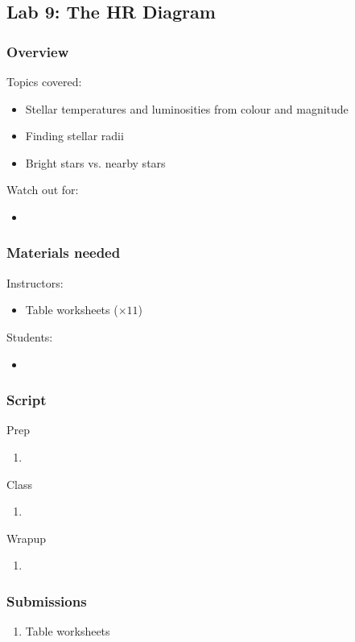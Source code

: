 \documentclass[12pt]{article}
\begin{document}
\newpage
\subsection{Lab 9: The HR Diagram}
\subsubsection{Overview}
Topics covered:
\begin{itemize}
\item Stellar temperatures and luminosities from colour and magnitude
\item Finding stellar radii
\item Bright stars vs. nearby stars
\end{itemize}
Watch out for:
\begin{itemize}
\item 
\end{itemize}

\subsubsection{Materials needed}
Instructors:
\begin{itemize}
  \item Table worksheets ($\times 11$)
\end{itemize}
Students:
\begin{itemize}
  \item 
\end{itemize}

\subsubsection{Script}
Prep
\begin{enumerate}
\item
\end{enumerate}
Class
\begin{enumerate}
\item
\end{enumerate}
Wrapup
\begin{enumerate}
\item
\end{enumerate}

\subsubsection{Submissions}
\begin{enumerate}
    \item Table worksheets
\end{enumerate}
\end{document}
